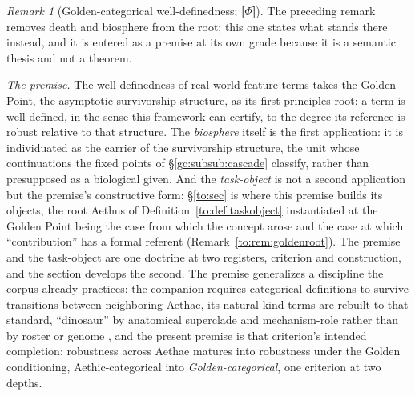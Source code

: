\documentclass[11pt]{article}
\numberwithin{equation}{section}
\theoremstyle{plain}
\theoremstyle{definition}
\theoremstyle{remark}
\newtheorem{remark}[theorem]{Remark}
\begin{document}
\begin{remark}[Golden-categorical well-definedness; \textbf{[$\Phi$]}]
\label{gr1:rem:goldendef}
The preceding remark removes death and biosphere from the root; this
one states what stands there instead, and it is entered as a premise
at its own grade because it is a semantic thesis and not a theorem.

\emph{The premise.} The well-definedness of real-world feature-terms
takes the Golden Point, the asymptotic survivorship structure, as its first-principles root: a term is well-defined, in the sense
this framework can certify, to the degree its reference is robust
relative to that structure. The \emph{biosphere} itself is the first
application: it is individuated as the carrier of the survivorship
structure, the unit whose continuations the fixed points of
\S\ref{gc:subsub:cascade} classify, rather than presupposed as a
biological given. And the \emph{task-object} is not a second
application but the premise's constructive form: \S\ref{to:sec} is
where this premise builds its objects, the root Aethus of
Definition~\ref{to:def:taskobject} instantiated at the Golden Point
being the case from which the concept arose and the case at which
``contribution'' has a formal referent
(Remark~\ref{to:rem:goldenroot}). The premise and the task-object are
one doctrine at two registers, criterion and construction, and
the section develops the second. The premise generalizes a discipline the corpus
already practices: the companion requires categorical definitions to
survive transitions between neighboring Aethae, its natural-kind
terms are rebuilt to that standard, ``dinosaur'' by anatomical
superclade and mechanism-role rather than by roster or genome
\cite{Nexus}, and the present premise is that criterion's intended
completion: robustness across Aethae matures into robustness under
the Golden conditioning, Aethic-categorical into
\emph{Golden-categorical}, one criterion at two depths.


\end{remark}
\end{document}
